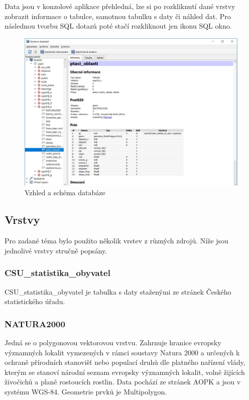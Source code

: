 \documentclass[a4paper, 12pt]{article}
\begin{document}
Data jsou v konzolové aplikace přehledná, lze si po rozkliknutí dané vrstvy zobrazit informace o tabulce, samotnou tabulku s daty či náhled dat. Pro následnou tvorbu SQL dotazů poté stačí rozkliknout jen ikonu SQL okno.

\begin{figure}[h!]
	\centering
	\includegraphics[width=12cm]{pictures/vzhled.jpg}
	\caption{Vzhled a schéma databáze}
\end{figure}



\subsection{Vrstvy}
Pro zadané téma bylo použito několik vrstev z různých zdrojů. Níže jsou jednolivé vrstvy stručně popsány.

\subsubsection{CSU\_statistika\_obyvatel}
CSU\_statistika\_obyvatel je tabulka s daty staženými ze stránek Českého statistického úřadu. 

\subsubsection{NATURA2000}
Jedná se o polygonovou vektorovou vrstvu. Zahrnuje hranice evropsky významných lokalit vymezených v rámci soustavy Natura 2000 a určených k ochraně přírodních stanovišť nebo populací druhů dle platného nařízení vlády, kterým se stanoví národní seznam evropsky významných lokalit, volně žijících živočichů a planě rostoucích rostlin. Data pochází ze stránek AOPK a jsou v systému WGS-84. Geometrie prvků je Multipolygon.
\end{document}
